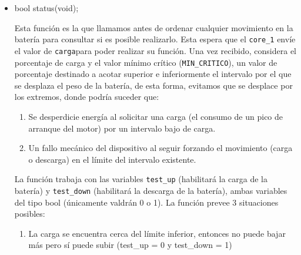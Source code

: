                 \begin{itemize} [label = ·]
                \setlength{\itemindent}{1.5em}
                
                    \item bool status(void);\par
                        Esta función es la que llamamos antes de ordenar cualquier movimiento en la batería para consultar si es posible realizarlo. Esta espera que el \texttt{core\_1} envíe el valor de \texttt{carga}para poder realizar su función. Una vez recibido, considera el porcentaje de carga y el valor mínimo crítico (\texttt{MIN\_CRITICO}), un valor de porcentaje destinado a acotar superior e inferiormente el intervalo por el que se desplaza el peso de la batería, de esta forma, evitamos que se desplace por los extremos, donde podría suceder que:\par
                        \begin{enumerate}
                        \setlength{\itemindent}{1.5em}
                        
                            \item  Se desperdicie energía al solicitar una carga (el consumo de un pico de arranque del motor) por un intervalo bajo de carga.\par
                            
                            \item Un fallo mecánico del dispositivo al seguir forzando el movimiento (carga o descarga) en el límite del intervalo existente.\par
                            
                        \end{enumerate}
        
                        La función trabaja con las variables \texttt{test\_up} (habilitará la carga de la batería) y \texttt{test\_down} (habilitará la descarga de la batería), ambas variables del tipo bool (únicamente valdrán 0 o 1). La función prevee 3 situaciones posibles:\par
                        
                        \begin{enumerate}
                        \setlength{\itemindent}{1.5em}
                        
                            \item La carga se encuentra cerca del límite inferior, entonces no puede bajar más pero sí puede subir (test\_up = 0 y test\_down = 1)\par
                            

\end{enumerate}
\end{itemize}
